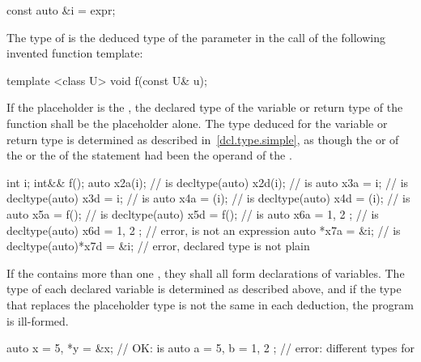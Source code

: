 \enterexample
\begin{codeblock}
const auto &i = expr;
\end{codeblock}

The type of  is the deduced type of the parameter  in
the call  of the following invented function template:

\begin{codeblock}
template <class U> void f(const U& u);
\end{codeblock}
\exitexample

If the placeholder is the  ,
the declared type of the variable or return type of the function shall be the
placeholder alone. The type deduced for the variable or return type is
determined as described in~\ref{dcl.type.simple}, as though the
 or  of the
 or the  of the
 statement had
been the operand of the . \enterexample
\begin{codeblock}
int i;
int&& f();
auto           x2a(i);         //  is 
decltype(auto) x2d(i);         //  is 
auto           x3a = i;        //  is 
decltype(auto) x3d = i;        //  is 
auto           x4a = (i);      //  is 
decltype(auto) x4d = (i);      //  is 
auto           x5a = f();      //  is 
decltype(auto) x5d = f();      //  is 
auto           x6a = { 1, 2 }; //  is 
decltype(auto) x6d = { 1, 2 }; // error,  is not an expression
auto          *x7a = &i;       //  is 
decltype(auto)*x7d = &i;       // error, declared type is not plain 
\end{codeblock}
\exitexample

\pnum
If the  contains more than one
, they shall all form declarations of
variables. The type of each declared variable is determined as
described above, and if the type that replaces the placeholder type is not the
same in each deduction, the program is ill-formed.

\enterexample
\begin{codeblock}
auto x = 5, *y = &x;        // OK:  is 
auto a = 5, b = { 1, 2 };   // error: different types for 
\end{codeblock}
\exitexample%

